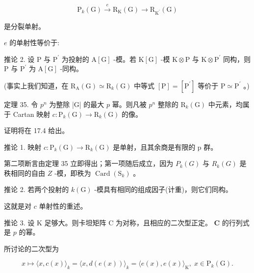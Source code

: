 \documentclass[10pt]{article}
\begin{document}
\[
{\mathrm{P}}_{k}\left( \mathrm{G}\right) \overset{e}{ \rightarrow  }{\mathrm{R}}_{\mathrm{K}}\left( \mathrm{G}\right)  \rightarrow  {\mathrm{R}}_{{\mathrm{K}}^{\prime }}\left( \mathrm{G}\right)
\]

是分裂单射。

\(e\) 的单射性等价于:

推论 2. 设 \(\mathrm{P}\) 与 \({\mathrm{P}}^{\prime }\) 为投射的 \(\mathrm{A}\left\lbrack  \mathrm{G}\right\rbrack\) -模。若 \(\mathrm{K}\left\lbrack  \mathrm{G}\right\rbrack\) -模 \(\mathrm{K} \otimes  \mathrm{P}\) 与 \(\mathrm{K} \otimes  {\mathrm{P}}^{\prime }\) 同构，则 \(\mathrm{P}\) 与 \({\mathrm{P}}^{\prime }\) 为 \(\mathrm{A}\left\lbrack  \mathrm{G}\right\rbrack\) -同构。

(事实上我们知道，在 \({\mathrm{R}}_{\mathrm{A}}\left( \mathrm{G}\right)  \simeq  {\mathrm{R}}_{k}\left( \mathrm{G}\right)\) 中等式 \(\left\lbrack  \mathrm{P}\right\rbrack   = \left\lbrack  {\mathrm{P}}^{\prime }\right\rbrack\) 等价于 \(\mathrm{P} \simeq  {\mathrm{P}}^{\prime }\) 。)

定理 35. 令 \({p}^{n}\) 为整除 |G| 的最大 \(p\) 幂。则凡被 \({p}^{n}\) 整除的 \({\mathrm{R}}_{k}\left( \mathrm{G}\right)\) 中元素，均属于 Cartan 映射 \(c : {\mathrm{P}}_{k}\left( \mathrm{G}\right)  \rightarrow  {\mathrm{R}}_{k}\left( \mathrm{G}\right)\) 的像。

证明将在 17.4 给出。

推论 1. 映射 \(c : {\mathrm{P}}_{k}\left( \mathrm{G}\right)  \rightarrow  {\mathrm{R}}_{k}\left( \mathrm{G}\right)\) 是单射，且其余商是有限的 p 群。

第二项断言由定理 35 立即得出；第一项随后成立，因为 \({P}_{k}\left( G\right)\) 与 \({R}_{k}\left( G\right)\) 是秩相同的自由 \(Z\) -模，即秩为 \(\operatorname{Card}\left( {\mathrm{S}}_{k}\right)\) 。

推论 2. 若两个投射的 \(k\left( \mathrm{G}\right)\) -模具有相同的组成因子(计重)，则它们同构。

这就是对 \(c\) 单射性的重述。

推论 3. 设 \(\mathrm{K}\) 足够大。则卡坦矩阵 \(\mathrm{C}\) 为对称，且相应的二次型正定。 \(\mathbf{C}\) 的行列式是 \(p\) 的幂。

所讨论的二次型为

\[
x \mapsto  \langle x,c\left( x\right) {\rangle }_{k} = \langle x,d\left( {e\left( x\right) }\right) {\rangle }_{k} = \langle e\left( x\right) ,e\left( x\right) {\rangle }_{\mathrm{K}},\;x \in  {\mathrm{P}}_{k}\left( \mathrm{G}\right) .
\]
\end{document}
